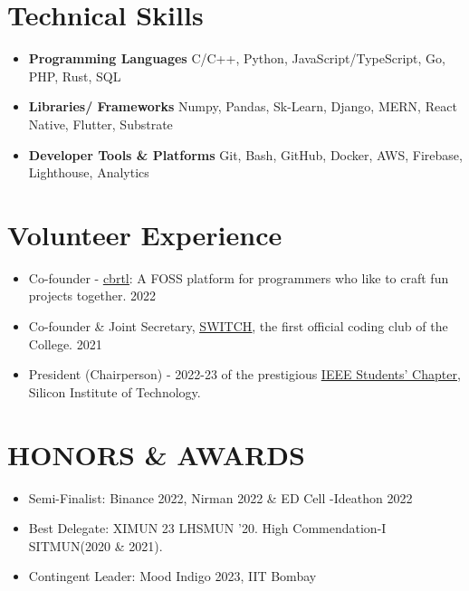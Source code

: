 \documentclass[letterpaper,11pt]{article}
\newcommand{\resumeItem}[1]{
  \item\small{
    {#1 \vspace{-2pt}}
  }
}
\newcommand{\resumeSubItem}[1]{\resumeItem{#1}\vspace{-4pt}}
\newcommand{\resumeSubHeadingListStart}{\begin{itemize}[leftmargin=0.15in, label={}]}
\newcommand{\resumeSubHeadingListEnd}{\end{itemize}}
\begin{document}
%

\section{Technical Skills}
  \resumeSubHeadingListStart
    \resumeSubItem{\textbf{Programming Languages}}
      {C/C++, Python, JavaScript/TypeScript, Go, PHP, Rust, SQL}
    \resumeSubItem{\textbf{Libraries/ Frameworks}}
      {Numpy, Pandas, Sk-Learn, Django, MERN, React Native, Flutter, Substrate }
    \resumeSubItem{\textbf{Developer Tools \& Platforms}}
      {Git, Bash, GitHub, Docker, AWS, Firebase, Lighthouse, Analytics}
  \resumeSubHeadingListEnd


%

\section{Volunteer Experience}
  \resumeSubHeadingListStart
    \resumeSubItem
      {Co-founder - \href{https://cbrtl.github.io}{\underline{cbrtl}}: A FOSS platform for programmers who like to craft fun projects together. 2022}
    \resumeSubItem
      {Co-founder \& Joint Secretary, \href{https://www.linkedin.com/company/switch-sit/}{\underline{SWITCH}}, the first official coding club of the College. 2021}
    \resumeSubItem
      {President (Chairperson) - 2022-23 of the prestigious \href{https://www.instagram.com/ieeesitbbsr/}{\underline{IEEE Students’ Chapter}}, Silicon Institute of Technology.}
  \resumeSubHeadingListEnd

%

\section{HONORS \& AWARDS}
  \resumeSubHeadingListStart
    \resumeSubItem
      {Semi-Finalist: Binance 2022, Nirman 2022 \& ED Cell -Ideathon 2022 }
    \resumeSubItem
      {Best Delegate: XIMUN 23 LHSMUN '20. High Commendation-I SITMUN(2020 \& 2021). }
    \resumeSubItem
      {Contingent Leader: Mood Indigo 2023, IIT Bombay}
  \resumeSubHeadingListEnd

\end{document}
